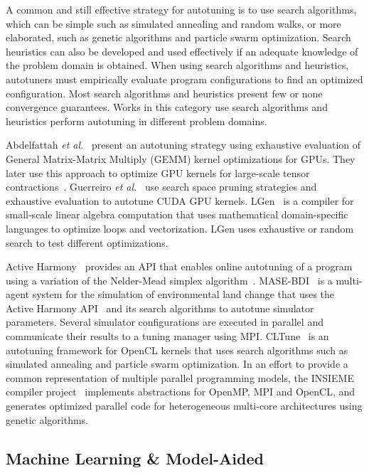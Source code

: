 A common and still effective strategy for autotuning is to use search
algorithms, which can be simple such as simulated annealing and random walks,
or more elaborated, such as genetic algorithms and particle swarm optimization.
Search heuristics can also be developed and used effectively if an adequate
knowledge of the problem domain is obtained. When using search algorithms and
heuristics, autotuners must empirically evaluate program configurations to find
an optimized configuration. Most search algorithms and heuristics present few
or none convergence guarantees. Works in this category use search
algorithms and heuristics perform autotuning in different problem domains.

Abdelfattah \emph{et al.}~\cite{abdelfattah2016performance} present an
autotuning strategy using exhaustive evaluation of General Matrix-Matrix
Multiply (GEMM) kernel optimizations for GPUs. They later use this approach to
optimize GPU kernels for large-scale tensor
contractions~\cite{abdelfattah2016high}.  Guerreiro \emph{et
al.}~\cite{guerreiro2015multi} use search space pruning strategies and
exhaustive evaluation to autotune CUDA GPU kernels.
LGen~\cite{spampinato2014basic} is a compiler for small-scale linear algebra
computation that uses mathematical domain-specific languages to optimize loops
and vectorization. LGen uses exhaustive or random search to test different
optimizations.

Active Harmony~\cite{tapus2002active} provides an API that enables online
autotuning of a program using a variation of the Nelder-Mead simplex
algorithm~\cite{nelder1965simplex}.  MASE-BDI~\cite{coelho2016mase} is a
multi-agent system for the simulation of environmental land change that uses
the Active Harmony API~\cite{tapus2002active} and its search algorithms to
autotune  simulator parameters.  Several simulator configurations are executed
in parallel and communicate their results to a tuning manager using MPI.
CLTune~\cite{nugteren2015cltune} is an autotuning framework for OpenCL kernels
that uses search algorithms such as simulated annealing and particle swarm
optimization.  In an effort to provide a common representation of multiple
parallel programming models, the INSIEME compiler
project~\cite{jordan2012multi} implements abstractions for OpenMP, MPI and
OpenCL, and generates optimized parallel code for heterogeneous multi-core
architectures using genetic algorithms.

\subsection{Machine Learning \& Model-Aided}

